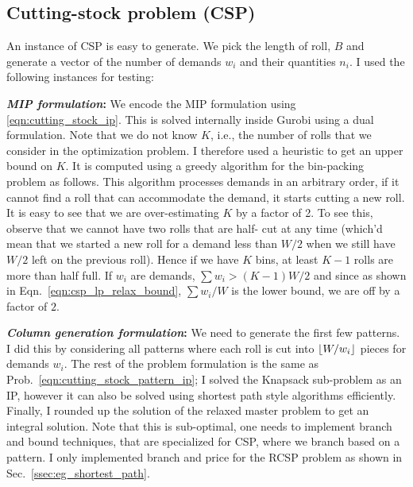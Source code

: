 \documentclass[letterpaper, 10pt, twocolumn, reqno]{amsart}
\begin{document}
\subsection{Cutting-stock problem (CSP)}
\label{ssec:eg_cutting_stock}

An instance of CSP is easy to generate. We pick the length of roll, $B$ and generate a vector of the number of demands $w_i$ and their quantities $n_i$. I used the following instances for testing:

\textbf{\emph{MIP formulation}:} We encode the MIP formulation using \eqref{eqn:cutting_stock_ip}. This is solved internally inside Gurobi using a dual formulation. Note that we do not know $K$, i.e., the number of rolls that we
consider in the optimization problem. I therefore used a heuristic to get an upper bound on $K$. It is computed using a greedy algorithm for the bin-packing problem as follows. This algorithm processes demands in an arbitrary
order, if it cannot find a roll that can accommodate the demand, it starts
cutting a new roll. It is easy to see that we are over-estimating $K$ by a factor of 2. To see this, observe that we cannot have two rolls that are half-
cut at any time (which'd mean that we started a new roll for a demand less than $W/2$ when we still have $W/2$ left on the previous roll). Hence if we
have $K$ bins, at least $K-1$ rolls are more than half full. If $w_i$ are demands, $\sum w_i > (K-1) W/2$ and since as shown in Eqn.~\eqref{eqn:csp_lp_relax_bound}, $\sum w_i/W$ is the lower bound, we are off by a factor of $2$.

\textbf{\emph{Column generation formulation}:} We need to generate the first few patterns. I did this by considering all patterns where each roll is cut into $\lfloor W/w_i\rfloor$ pieces for demands $w_i$. The rest of the problem formulation is the same as Prob.~\ref{eqn:cutting_stock_pattern_ip}; I solved the Knapsack sub-problem as an IP, however it can also be solved using shortest path style algorithms efficiently. Finally, I rounded up the solution of the relaxed master problem to get an integral solution. Note that this is sub-optimal, one needs to implement branch and bound techniques, that are specialized for CSP, where we branch based on a pattern. I only implemented branch and price for the RCSP problem as shown in Sec.~\ref{ssec:eg_shortest_path}.
\end{document}
